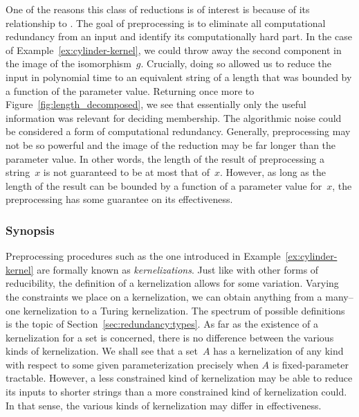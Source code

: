 One of the reasons this class of reductions is of interest is because of its relationship to .
The goal of preprocessing is to eliminate all computational redundancy from an input and identify its computationally hard part.
In the case of Example~\ref{ex:cylinder-kernel}, we could throw away the second component in the image of the isomorphism~$g$.
Crucially, doing so allowed us to reduce the input in polynomial time to an equivalent string of a length that was bounded by a function of the parameter value.
Returning once more to Figure~\ref{fig:length_decomposed}, we see that essentially only the useful information was relevant for deciding membership.
The algorithmic noise could be considered a form of computational redundancy.
Generally, preprocessing may not be so powerful and the image of the reduction may be far longer than the parameter value.
In other words, the length of the result of preprocessing a string~$x$ is not guaranteed to be at most that of~$x$.
However, as long as the length of the result can be bounded by a function of a parameter value for~$x$, the preprocessing has some guarantee on its effectiveness.

\subsubsection*{Synopsis}
Preprocessing procedures such as the one introduced in Example~\ref{ex:cylinder-kernel} are formally known as \emph{kernelizations}.
Just like with other forms of reducibility, the definition of a kernelization allows for some variation.
Varying the constraints we place on a kernelization, we can obtain anything from a many--one kernelization to a Turing kernelization.
The spectrum of possible definitions is the topic of Section~\ref{sec:redundancy:types}.
As far as the existence of a kernelization for a set is concerned, there is no difference between the various kinds of kernelization.
We shall see that a set~$A$ has a kernelization of any kind with respect to some given parameterization precisely when $A$ is fixed-parameter tractable.
However, a less constrained kind of kernelization may be able to reduce its inputs to shorter strings than a more constrained kind of kernelization could.
In that sense, the various kinds of kernelization may differ in effectiveness.

